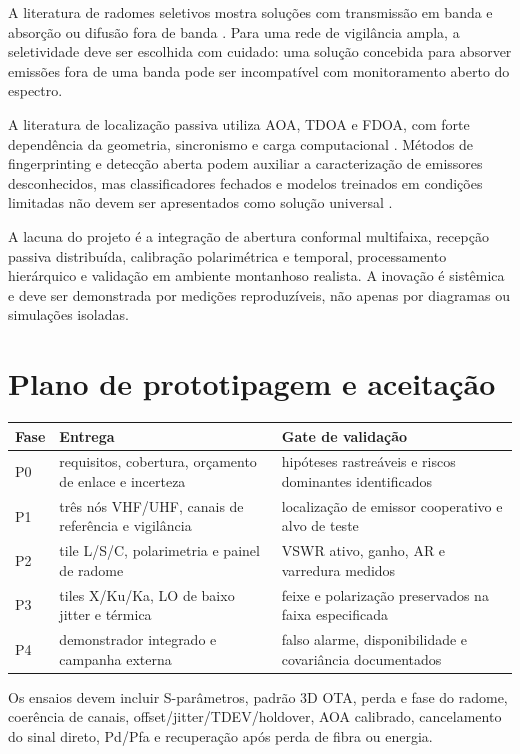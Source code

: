 \documentclass[11pt,a4paper]{report}
\begin{document}
A literatura de radomes seletivos mostra soluções com transmissão em banda e absorção ou difusão fora de banda \citep{costa2012,lv2021,omar2018,sheng2024}. Para uma rede de vigilância ampla, a seletividade deve ser escolhida com cuidado: uma solução concebida para absorver emissões fora de uma banda pode ser incompatível com monitoramento aberto do espectro.

A literatura de localização passiva utiliza AOA, TDOA e FDOA, com forte dependência da geometria, sincronismo e carga computacional \citep{liu2019,pine2021}. Métodos de fingerprinting e detecção aberta podem auxiliar a caracterização de emissores desconhecidos, mas classificadores fechados e modelos treinados em condições limitadas não devem ser apresentados como solução universal \citep{soltanieh2020,jagannath2022,sun2022}.

A lacuna do projeto é a integração de abertura conformal multifaixa, recepção passiva distribuída, calibração polarimétrica e temporal, processamento hierárquico e validação em ambiente montanhoso realista. A inovação é sistêmica e deve ser demonstrada por medições reproduzíveis, não apenas por diagramas ou simulações isoladas.

\chapter{Plano de prototipagem e aceitação}

\begin{longtable}{p{}p{}p{}}
\toprule
\textbf{Fase} & \textbf{Entrega} & \textbf{Gate de validação}\\
\midrule
P0 & requisitos, cobertura, orçamento de enlace e incerteza & hipóteses rastreáveis e riscos dominantes identificados\\
P1 & três nós VHF/UHF, canais de referência e vigilância & localização de emissor cooperativo e alvo de teste\\
P2 & tile L/S/C, polarimetria e painel de radome & VSWR ativo, ganho, AR e varredura medidos\\
P3 & tiles X/Ku/Ka, LO de baixo jitter e térmica & feixe e polarização preservados na faixa especificada\\
P4 & demonstrador integrado e campanha externa & falso alarme, disponibilidade e covariância documentados\\
\bottomrule
\end{longtable}

Os ensaios devem incluir S-parâmetros, padrão 3D OTA, perda e fase do radome, coerência de canais, offset/jitter/TDEV/holdover, AOA calibrado, cancelamento do sinal direto, Pd/Pfa e recuperação após perda de fibra ou energia.
\end{document}
